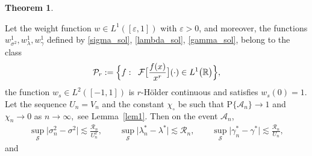 \documentclass[a4paper,11pt]{article}
\theoremstyle{definition}
\newcommand{\R}{{\mathbb{R}}}
\newcommand{\1}{\mathbb{I}}
\newcommand{\A}{\mathscr{A}}
\renewcommand{\A}{\mathcal{A}}
\def\R{\mathbb{R}}
\newcommand{\eps}{\varepsilon}
\newcommand{\e}{e}
\renewcommand{\P}{{\mathrm P}}
\newcommand{\F}{\mathcal{F}}
\newtheorem{thm}{Theorem}
\theoremstyle{remark}
\begin{document}
\begin{thm}\label{thm1}




Let the weight function \(w \in L^1([\eps,1] )\) with  \(\eps>0\), and moreover, the functions \(w^{1}_{\sigma^2}, w^{1}_{\lambda}, w^{1}_{\gamma}\) defined by \eqref{sigma_sol}, \eqref{lambda_sol}, \eqref{gamma_sol},
belong to the class 
\begin{equation*}
\mathcal{P}_r := \Bigl\{ 
f: \;\; \F \bigl[ 
\frac{f(x)}{x^r}\bigr](\cdot)\in L^1 \bigl(\R \bigr)
\Bigr\},
\end{equation*}
the function \(w_s \in L^2([-1,1])\) is \(r\)-H{\"o}lder continuous and satisfies \(w_s(0)=1\). Let the sequence \(U_n=V_n\) and the constant \(\chi_\circ\) be such that \(\P\{\A_n\} \to 1\) and \(\chi_n \to 0\) as \(n \to \infty,\)  see Lemma~\ref{lem1}. %
Then on the event $\A_n$,
\begin{eqnarray*}
\sup_{\mathcal{S}}
\bigl|\sigma^2_n - \sigma^2
\bigr| \lesssim \frac{\mathcal{R}_n}{U_n^2},  \qquad
\sup_{\mathcal{S}}
\bigl|\lambda_n^* - \lambda^*
\bigr| \lesssim\mathcal{R}_n, \qquad
\sup_{\mathcal{S}}
\bigl|\gamma^*_n - \gamma^*
\bigr| \lesssim \frac{\mathcal{R}_n}{U_n},
\end{eqnarray*}
and
\begin{eqnarray*}

\end{eqnarray*}
\end{thm}
\end{document}

